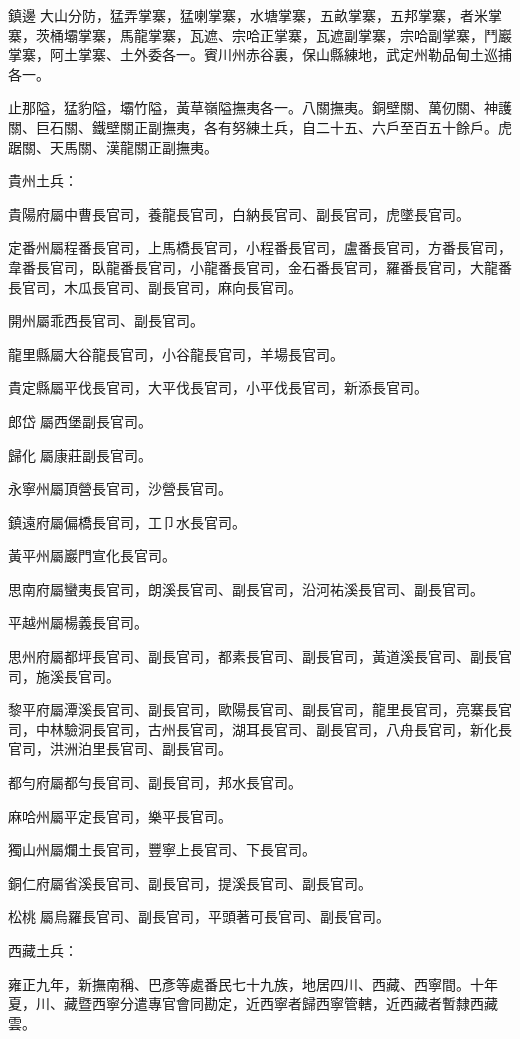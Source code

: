 \begin{pinyinscope}
鎮邊大山分防，猛弄掌寨，猛喇掌寨，水塘掌寨，五畝掌寨，五邦掌寨，者米掌寨，茨桶壩掌寨，馬龍掌寨，瓦遮、宗哈正掌寨，瓦遮副掌寨，宗哈副掌寨，鬥巖掌寨，阿土掌寨、土外委各一。賓川州赤谷裏，保山縣練地，武定州勒品甸土巡捕各一。

止那隘，猛豹隘，壩竹隘，黃草嶺隘撫夷各一。八關撫夷。銅壁關、萬仞關、神護關、巨石關、鐵壁關正副撫夷，各有努練土兵，自二十五、六戶至百五十餘戶。虎踞關、天馬關、漢龍關正副撫夷。

貴州土兵：

貴陽府屬中曹長官司，養龍長官司，白納長官司、副長官司，虎墜長官司。

定番州屬程番長官司，上馬橋長官司，小程番長官司，盧番長官司，方番長官司，韋番長官司，臥龍番長官司，小龍番長官司，金石番長官司，羅番長官司，大龍番長官司，木瓜長官司、副長官司，麻向長官司。

開州屬乖西長官司、副長官司。

龍里縣屬大谷龍長官司，小谷龍長官司，羊場長官司。

貴定縣屬平伐長官司，大平伐長官司，小平伐長官司，新添長官司。

郎岱屬西堡副長官司。

歸化屬康莊副長官司。

永寧州屬頂營長官司，沙營長官司。

鎮遠府屬偏橋長官司，工⼙水長官司。

黃平州屬巖門宣化長官司。

思南府屬蠻夷長官司，朗溪長官司、副長官司，沿河祐溪長官司、副長官司。

平越州屬楊義長官司。

思州府屬都坪長官司、副長官司，都素長官司、副長官司，黃道溪長官司、副長官司，施溪長官司。

黎平府屬潭溪長官司、副長官司，歐陽長官司、副長官司，龍里長官司，亮寨長官司，中林驗洞長官司，古州長官司，湖耳長官司、副長官司，八舟長官司，新化長官司，洪洲泊里長官司、副長官司。

都勻府屬都勻長官司、副長官司，邦水長官司。

麻哈州屬平定長官司，樂平長官司。

獨山州屬爛土長官司，豐寧上長官司、下長官司。

銅仁府屬省溪長官司、副長官司，提溪長官司、副長官司。

松桃屬烏羅長官司、副長官司，平頭著可長官司、副長官司。

西藏土兵：

雍正九年，新撫南稱、巴彥等處番民七十九族，地居四川、西藏、西寧間。十年夏，川、藏暨西寧分遣專官會同勘定，近西寧者歸西寧管轄，近西藏者暫隸西藏雲。


\end{pinyinscope}
